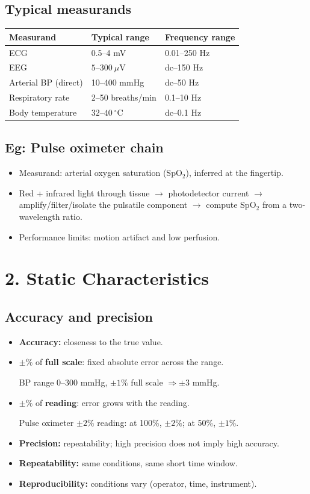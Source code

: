 \documentclass[10pt,a4paper]{ctexart}
\newcommand{\key}[1]{\textbf{#1}}
\begin{document}
\begin{multicols*}{3}
\subsection{Typical measurands}
\begin{center}\small
\begin{tabularx}{\linewidth}{@{}lYY@{}}
\toprule
Measurand & Typical range & Frequency range\\
\midrule
ECG & 0.5--4 mV & 0.01--250 Hz\\
EEG & $5$--$300~\mu\mathrm V$ & dc--150 Hz\\
Arterial BP (direct) & 10--400 mmHg & dc--50 Hz\\
Respiratory rate & 2--50 breaths/min & 0.1--10 Hz\\
Body temperature & $32$--$40~^\circ\mathrm C$ & dc--0.1 Hz\\
\bottomrule
\end{tabularx}
\end{center}

\subsection{Eg: Pulse oximeter chain}
\begin{itemize}
  \item Measurand: arterial oxygen saturation (SpO$_2$), inferred at the fingertip.
  \item Red + infrared light through tissue $\rightarrow$ photodetector current
  $\rightarrow$ amplify/filter/isolate the pulsatile component $\rightarrow$
  compute SpO$_2$ from a two-wavelength ratio.
  \item Performance limits: motion artifact and low perfusion.
\end{itemize}


\section{2. Static Characteristics}
\subsection{Accuracy and precision}
\begin{itemize}
  \item \key{Accuracy:} closeness to the true value.
  \item $\pm\%$ of \key{full scale}: fixed absolute error across the range.\par
    BP range 0--300 mmHg, $\pm1\%$ full scale $\Rightarrow \pm3$ mmHg.
  \item $\pm\%$ of \key{reading}: error grows with the reading.\par
    Pulse oximeter $\pm2\%$ reading: at 100\%, $\pm2\%$; at 50\%, $\pm1\%$.
  \item \key{Precision:} repeatability; high precision does not imply high accuracy.
  \item \key{Repeatability:} same conditions, same short time window.
  \item \key{Reproducibility:} conditions vary (operator, time, instrument).
\end{itemize}


\end{multicols*}
\end{document}
